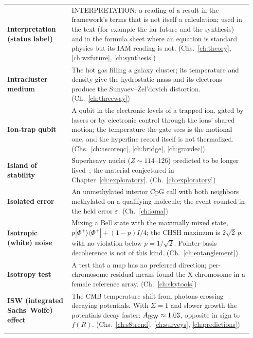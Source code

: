 {\begin{longtable}{@{}>{\raggedright\arraybackslash}p{}>{\raggedright\arraybackslash}p{}@{}}
\textbf{Interpretation (status label)} & INTERPRETATION: a reading of a result in the framework's terms that is not itself a calculation; used in the text (for example the far future and the synthesis) and in the formula sheet where an equation is standard physics but its IAM reading is not. {\footnotesize(Chs.~\ref{ch:theory}, \ref{ch:wzfuture}, \ref{ch:synthesis})}\\[1pt]
\textbf{Intracluster medium} & The hot gas filling a galaxy cluster; its temperature and density give the hydrostatic mass and its electrons produce the Sunyaev--Zel'dovich distortion. {\footnotesize(Ch.~\ref{ch:threeway})}\\[1pt]
\textbf{Ion-trap qubit} & A qubit in the electronic levels of a trapped ion, gated by lasers or by electronic control through the ions' shared motion; the temperature the gate sees is the motional one, and the hyperfine record itself is not thermalized. {\footnotesize(Chs.~\ref{ch:ascoreqc}, \ref{ch:bridge}, \ref{ch:gravdec})}\\[1pt]
\textbf{Island of stability} & Superheavy nuclei ($Z\sim114$--126) predicted to be longer lived~\cite{Oganessian2015}; the material conjectured in Chapter~\ref{ch:exploratory}. {\footnotesize(Ch.~\ref{ch:exploratory})}\\[1pt]
\textbf{Isolated error} & An unmethylated interior CpG call with both neighbors methylated on a qualifying molecule; the event counted in the held error $\varepsilon$. {\footnotesize(Ch.~\ref{ch:iama})}\\[1pt]
\textbf{Isotropic (white) noise} & Mixing a Bell state with the maximally mixed state, $p|\Phi^+\rangle\langle\Phi^+|+(1-p)I/4$; the CHSH maximum is $2\sqrt2\,p$, with no violation below $p=1/\sqrt2$. Pointer-basis decoherence is not of this kind. {\footnotesize(Ch.~\ref{ch:entanglement})}\\[1pt]
\textbf{Isotropy test} & A test that a map has no preferred direction; per-chromosome residual means found the X chromosome in a female reference array. {\footnotesize(Ch.~\ref{ch:skytools})}\\[1pt]
\textbf{ISW (integrated Sachs--Wolfe) effect} & The CMB temperature shift from photons crossing decaying potentials. With $\Sigma=1$ and slower growth the potentials decay faster: $A_{\rm ISW}\approx1.03$, opposite in sign to $f(R)$. {\footnotesize(Chs.~\ref{ch:s8trend}, \ref{ch:surveys}, \ref{ch:predictions})}\\[1pt]
\multicolumn{2}{@{}l}{\normalsize\textbf{J}}\\[2pt]

\end{longtable}}
